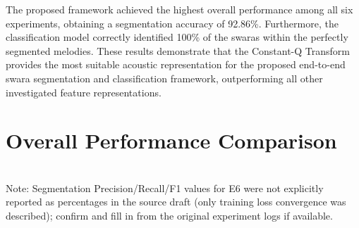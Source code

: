 The proposed framework achieved the highest overall performance among all six experiments, obtaining a segmentation accuracy of 92.86\%. Furthermore, the classification model correctly identified 100\% of the swaras within the perfectly segmented melodies. These results demonstrate that the Constant-Q Transform provides the most suitable acoustic representation for the proposed end-to-end swara segmentation and classification framework, outperforming all other investigated feature representations.


\section{Overall Performance Comparison}

\begin{table}[H]
\centering
\caption{Overall Performance Comparison of All Experiments}
\label{tab:overall-comparison}
\vspace{2mm}
\\
{\footnotesize Note: Segmentation Precision/Recall/F1 values for E6 were not explicitly reported as percentages in the source draft (only training loss convergence was described); confirm and fill in from the original experiment logs if available.}
\end{table}

